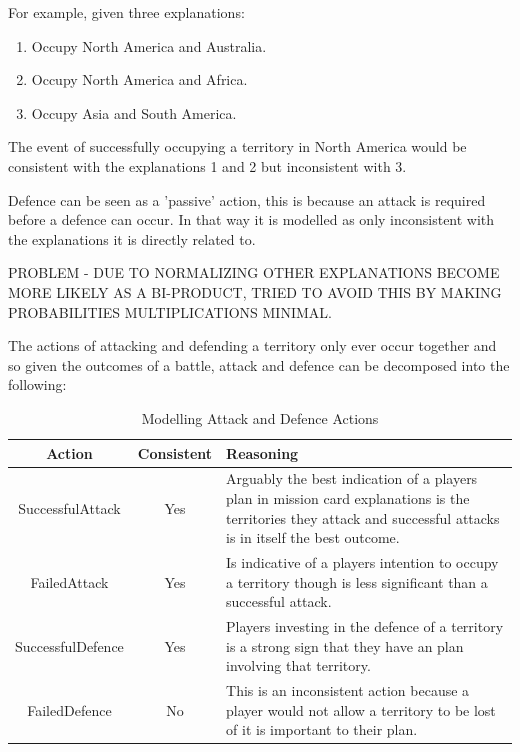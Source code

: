 \documentclass[parskip]{cs4rep}
\begin{document}
For example, given three explanations:

\begin{enumerate}
\item
Occupy North America and Australia.
\item
Occupy North America and Africa.
\item
Occupy Asia and South America.
\end{enumerate}

The event of successfully occupying a territory in North America would be consistent with the explanations 1 and 2 but inconsistent with 3.

Defence can be seen as a 'passive' action, this is because an attack is required before a defence can occur. In that way it is modelled as only inconsistent with the explanations it is directly related to.

PROBLEM - DUE TO NORMALIZING OTHER EXPLANATIONS BECOME MORE LIKELY AS A BI-PRODUCT, TRIED TO AVOID THIS BY MAKING PROBABILITIES MULTIPLICATIONS MINIMAL.

The actions of attacking and defending a territory only ever occur together and so given the outcomes of a battle, attack and defence can be decomposed into the following:

\begin{table}[ht]
\centering
\begin{tabular}{|c|c|p{8cm}|}
\hline 
\textbf{Action} & \textbf{Consistent}  & \textbf{Reasoning} \\ 
\hline 
SuccessfulAttack & Yes & Arguably the best indication of a players plan in mission card explanations is the territories they attack and successful attacks is in itself the best outcome. \\ 
\hline 
FailedAttack & Yes & Is indicative of a players intention to occupy a territory though is less significant than a successful attack.\\ 
\hline 
SuccessfulDefence & Yes & Players investing in the defence of a territory is a strong sign that they have an plan involving that territory. \\ 
\hline 
FailedDefence & No & This is an inconsistent action because a player would not allow a territory to be lost of it is important to their plan. \\ 
\hline
\end{tabular}
\caption{Modelling Attack and Defence Actions}
\label{table:attack-defend-modelling}
\end{table}
\end{document}
